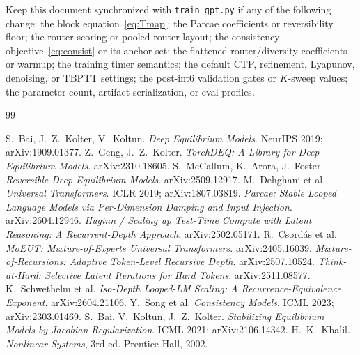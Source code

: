 \documentclass[11pt]{article}
\begin{document}
Keep this document synchronized with \texttt{train\_gpt.py} if any of the following change: the
block equation~\eqref{eq:Tmap}; the Parcae coefficients or reversibility floor; the router scoring or
pooled-router layout; the consistency objective~\eqref{eq:consist} or its anchor set; the
flattened router/diversity coefficients or warmup; the training timer semantics; the default CTP,
refinement, Lyapunov, denoising, or TBPTT settings; the post-int6 validation gates or $K$-sweep
values; the parameter count, artifact serialization, or eval profiles.

\begin{thebibliography}{99}

 S.~Bai, J.~Z.~Kolter, V.~Koltun. \emph{Deep Equilibrium Models}. NeurIPS 2019; arXiv:1909.01377.
 Z.~Geng, J.~Z.~Kolter. \emph{TorchDEQ: A Library for Deep Equilibrium Models}. arXiv:2310.18605.
 S.~McCallum, K.~Arora, J.~Foster. \emph{Reversible Deep Equilibrium Models}. arXiv:2509.12917.
 M.~Dehghani et al. \emph{Universal Transformers}. ICLR 2019; arXiv:1807.03819.
 \emph{Parcae: Stable Looped Language Models via Per-Dimension Damping and Input Injection}. arXiv:2604.12946.
 \emph{Huginn / Scaling up Test-Time Compute with Latent Reasoning: A Recurrent-Depth Approach}. arXiv:2502.05171.
 R.~Csord\'as et al. \emph{MoEUT: Mixture-of-Experts Universal Transformers}. arXiv:2405.16039.
 \emph{Mixture-of-Recursions: Adaptive Token-Level Recursive Depth}. arXiv:2507.10524.
 \emph{Think-at-Hard: Selective Latent Iterations for Hard Tokens}. arXiv:2511.08577.
 K.~Schwethelm et al. \emph{Iso-Depth Looped-LM Scaling: A Recurrence-Equivalence Exponent}. arXiv:2604.21106.
 Y.~Song et al. \emph{Consistency Models}. ICML 2023; arXiv:2303.01469.
 S.~Bai, V.~Koltun, J.~Z.~Kolter. \emph{Stabilizing Equilibrium Models by Jacobian Regularization}. ICML 2021; arXiv:2106.14342.
 H.~K.~Khalil. \emph{Nonlinear Systems}, 3rd ed. Prentice Hall, 2002.

\end{thebibliography}
\end{document}
